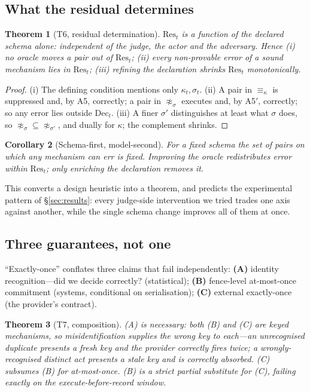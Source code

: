 \documentclass[10pt,twocolumn]{article}
\newtheorem{theorem}{Theorem}
\newtheorem{corollary}[theorem]{Corollary}
\theoremstyle{definition}
\theoremstyle{remark}
\newcommand{\Res}{\mathrm{Res}_t}
\newcommand{\Dec}{\mathrm{Dec}_t}
\begin{document}
\subsection{What the residual determines}

\begin{theorem}[T6, residual determination]
\label{thm:t6}
$\Res$ is a function of the declared schema alone: independent of the judge, the
actor and the adversary. Hence (i) no oracle moves a pair out of $\Res$;
(ii) every non-provable error of a sound mechanism lies in $\Res$; (iii)
refining the declaration shrinks $\Res$ monotonically.
\end{theorem}

\begin{proof}
(i) The defining condition mentions only $\kappa_t,\sigma_t$. (ii) A pair in
$\equiv_\kappa$ is suppressed and, by A5, correctly; a pair in
$\not\approx_\sigma$ executes and, by A5$'$, correctly; so any error lies outside
$\Dec$. (iii) A finer $\sigma'$ distinguishes at least what $\sigma$ does, so
$\not\approx_\sigma \subseteq \not\approx_{\sigma'}$, and dually for $\kappa$;
the complement shrinks.
\end{proof}

\begin{corollary}[Schema-first, model-second]
For a fixed schema the set of pairs on which \emph{any} mechanism can err is
fixed. Improving the oracle redistributes error within $\Res$; only enriching the
declaration removes it.
\end{corollary}

This converts a design heuristic into a theorem, and predicts the experimental
pattern of \S\ref{sec:results}: every judge-side intervention we tried trades one
axis against another, while the single schema change improves all of them at
once.

\subsection{Three guarantees, not one}

``Exactly-once'' conflates three claims that fail independently:
\textbf{(A)} identity recognition---did we decide correctly? (statistical);
\textbf{(B)} fence-level at-most-once commitment (systems, conditional on
serialisation); \textbf{(C)} external exactly-once (the provider's contract).

\begin{theorem}[T7, composition]
(A) is necessary: both (B) and (C) are keyed mechanisms, so misidentification
supplies the wrong key to each---an unrecognised duplicate presents a fresh key
and the provider correctly fires twice; a wrongly-recognised distinct act
presents a stale key and is correctly absorbed. (C) subsumes (B) for
at-most-once. (B) is a strict partial substitute for (C), failing exactly on the
execute-before-record window.
\end{theorem}
\end{document}
